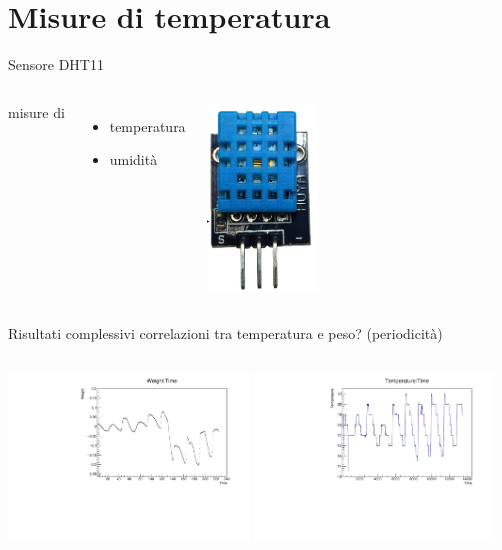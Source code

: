 \documentclass{beamer}
\begin{document}
\section{Misure di temperatura}
\begin{frame}{Sensore DHT11}
  \begin{columns}[c] 
      misure di 
      \begin{itemize}
        \item temperatura
        \item umidit\`a
      \end{itemize}
      \includegraphics[height=5cm]{../Foto/DHT11}
  \end{columns}
\end{frame}
\begin{frame}{Risultati complessivi}
  correlazioni tra temperatura e peso? (periodicit\`a)
  \begin{columns}[c] 
      \includegraphics[height=4.5cm]{../../analisi_dati/171010_long_sd_temp/M_Weight}
      \includegraphics[height=4.5cm]{../../analisi_dati/171010_long_sd_temp/M_Temperature}   
  \end{columns}
\end{frame}
\end{document}
